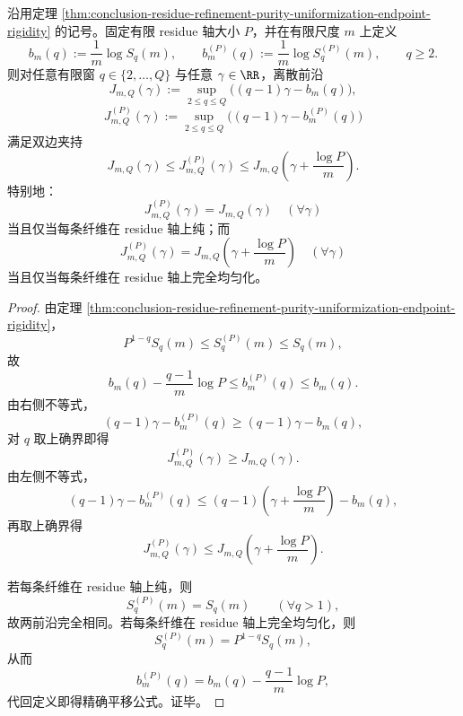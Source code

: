 \begin{theorem}\label{thm:conclusion-residue-refinement-discrete-legendre-shift-lift-law}
沿用定理 \ref{thm:conclusion-residue-refinement-purity-uniformization-endpoint-rigidity} 的记号。固定有限 residue 轴大小 \(P\)，并在有限尺度 \(m\) 上定义
\[
b_m(q):=\frac1m\log S_q(m),
\qquad
b_m^{(P)}(q):=\frac1m\log S_q^{(P)}(m),
\qquad q\ge2.
\]
则对任意有限窗 \(q\in\{2,\dots,Q\}\) 与任意 \(\gamma\in\RR\)，离散前沿
\[
J_{m,Q}(\gamma):=\sup_{2\le q\le Q}\bigl((q-1)\gamma-b_m(q)\bigr),
\]
\[
J_{m,Q}^{(P)}(\gamma):=\sup_{2\le q\le Q}\bigl((q-1)\gamma-b_m^{(P)}(q)\bigr)
\]
满足双边夹持
\[
J_{m,Q}(\gamma)\le J_{m,Q}^{(P)}(\gamma)
\le
J_{m,Q}\!\left(\gamma+\frac{\log P}{m}\right).
\]
特别地：
\[
J_{m,Q}^{(P)}(\gamma)=J_{m,Q}(\gamma)\quad(\forall \gamma)
\]
当且仅当每条纤维在 residue 轴上纯；而
\[
J_{m,Q}^{(P)}(\gamma)=
J_{m,Q}\!\left(\gamma+\frac{\log P}{m}\right)
\quad(\forall \gamma)
\]
当且仅当每条纤维在 residue 轴上完全均匀化。
\end{theorem}
\begin{proof}
由定理 \ref{thm:conclusion-residue-refinement-purity-uniformization-endpoint-rigidity}，
\[
P^{1-q}S_q(m)\le S_q^{(P)}(m)\le S_q(m),
\]
故
\[
b_m(q)-\frac{q-1}{m}\log P
\le
b_m^{(P)}(q)
\le
b_m(q).
\]
由右侧不等式，
\[
(q-1)\gamma-b_m^{(P)}(q)\ge (q-1)\gamma-b_m(q),
\]
对 \(q\) 取上确界即得
\[
J_{m,Q}^{(P)}(\gamma)\ge J_{m,Q}(\gamma).
\]
由左侧不等式，
\[
(q-1)\gamma-b_m^{(P)}(q)
\le
(q-1)\left(\gamma+\frac{\log P}{m}\right)-b_m(q),
\]
再取上确界得
\[
J_{m,Q}^{(P)}(\gamma)
\le
J_{m,Q}\!\left(\gamma+\frac{\log P}{m}\right).
\]

若每条纤维在 residue 轴上纯，则
\[
S_q^{(P)}(m)=S_q(m)
\qquad(\forall q>1),
\]
故两前沿完全相同。若每条纤维在 residue 轴上完全均匀化，则
\[
S_q^{(P)}(m)=P^{1-q}S_q(m),
\]
从而
\[
b_m^{(P)}(q)=b_m(q)-\frac{q-1}{m}\log P,
\]
代回定义即得精确平移公式。证毕。
\end{proof}



